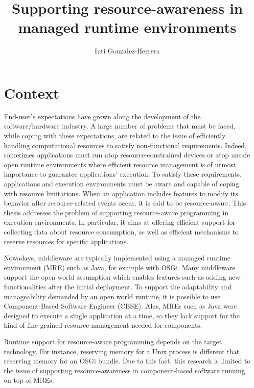 \documentclass[11pt,a4paper]{paper}
\title{Supporting resource-awareness in managed runtime environments}
\author{Inti Gonzalez-Herrera}
\begin{document}
\maketitle

\section{Context}

End-user's expectations have grown along the development of the software/hardware industry.
A large number of problems that must be faced, while coping with these expectations, are related to the issue of efficiently handling computational resources to satisfy non-functional requirements.
Indeed, sometimes applications must run atop resource-constrained devices or atop unsafe open runtime environments where efficient resource management is of utmost importance to guarantee applications' execution.
To satisfy these requirements, applications and execution environments must be aware and capable of coping with resource limitations.
When an application includes features to modify its behavior after resource-related events occur, it is said to be resource-aware.
This thesis addresses the problem of supporting resource-aware programming in execution environments.
In particular, it aims at offering efficient support for collecting data about resource consumption, as well as efficient mechanisms to reserve resources for specific applications.

Nowadays, middleware are typically implemented using a managed runtime environment (MRE) such as Java, for example with OSGi.
Many middleware support the open world assumption which enables features such as adding new functionalities after the initial deployment.
To support the adaptability and manageability demanded by an open world runtime, it is possible to use Component-Based Software Engineer (CBSE).
Alas, MREs such as Java were designed to execute a single application at a time, so they lack support for the kind of fine-grained resource management needed for components.

Runtime support for resource-aware programming depends on the target technology.
For instance, reserving memory for a Unix process is different that reserving memory for an OSGi bundle.
Due to this fact, this research is limited to the issue of supporting resource-awareness in component-based software running on top of MREs.
\end{document}
